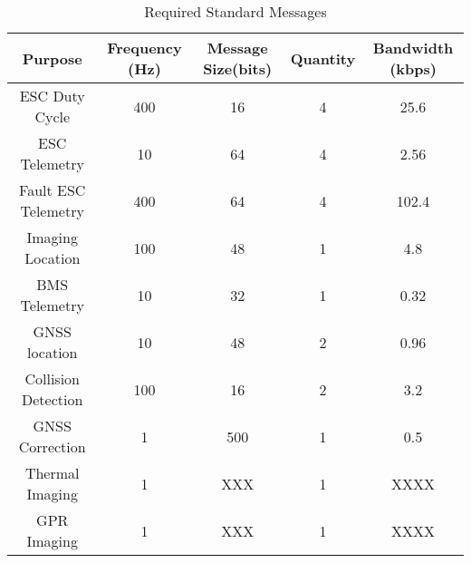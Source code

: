 \begin{table}[h]
\centering
\begin{tabular}{|c|c|c|c|c|} 
\hline
\textbf{Purpose}&\textbf{Frequency (Hz)}&\textbf{Message Size(bits)}&\textbf{Quantity}&\textbf{Bandwidth (kbps)}\\
\hline
ESC Duty Cycle&400&16&4&25.6\\
ESC Telemetry&10&64&4&2.56\\
Fault ESC Telemetry&400&64&4&102.4\\
Imaging Location&100&48&1&4.8\\
BMS Telemetry&10&32&1&0.32\\
GNSS location&10&48&2&0.96\\
Collision Detection&100&16&2&3.2\\
GNSS Correction&1&500&1&0.5\\
Thermal Imaging&1&XXX&1&XXXX\\
GPR Imaging&1&XXX&1&XXXX\\
\hline
\end{tabular}
\caption{Required Standard Messages}
\label{tab:messages}
\end{table}
